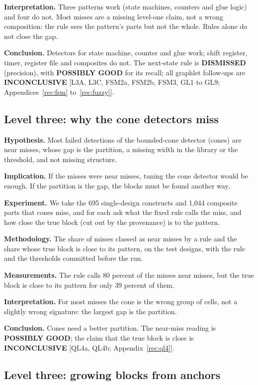 \documentclass[conference]{IEEEtran}
\newcommand{\verdict}[1]{\textbf{\textsc{#1}}}
\newcommand{\hev}[1]{\par\smallskip\noindent\textbf{#1}}
\begin{document}
\hev{Interpretation.} Three patterns work (state machines, counters and glue logic) and four do not. Most misses are a missing level-one claim, not a wrong composition: the rule sees the pattern's parts but not the whole. Rules alone do not close the gap.

\hev{Conclusion.} Detectors for state machine, counter and glue work; shift register, timer, register file and composites do not. The next-state rule is \verdict{DISMISSED} (precision), with \verdict{POSSIBLY GOOD} for its recall; all graphlet follow-ups are \verdict{INCONCLUSIVE} [L3A, L3C, FSM2a, FSM2b, FSM3, GL1 to GL9; Appendices~\ref{rec:fsm} to~\ref{rec:fuzzy}].

\subsection{Level three: why the cone detectors miss}
\label{arg:ra9}

\hev{Hypothesis.} Most failed detections of the bounded-cone detector (cones) are near misses, whose gap is the partition, a missing width in the library or the threshold, and not missing structure.

\hev{Implication.} If the misses were near misses, tuning the cone detector would be enough. If the partition is the gap, the blocks must be found another way.

\hev{Experiment.} We take the 695 single-design constructs and 1,044 composite parts that cones miss, and for each ask what the fixed rule calls the miss, and how close the true block (cut out by the provenance) is to the pattern.

\hev{Methodology.} The share of misses classed as near misses by a rule and the share whose true block is close to its pattern, on the test designs, with the rule and the thresholds committed before the run.

\hev{Measurements.} The rule calls 80 percent of the misses near misses, but the true block is close to its pattern for only 39 percent of them.

\hev{Interpretation.} For most misses the cone is the wrong group of cells, not a slightly wrong signature: the largest gap is the partition.

\hev{Conclusion.} Cones need a better partition. The near-miss reading is \verdict{POSSIBLY GOOD}; the claim that the true block is close is \verdict{INCONCLUSIVE} [QL4a, QL4b; Appendix~\ref{rec:ql4}].

\subsection{Level three: growing blocks from anchors}
\label{arg:ra10}
\end{document}
